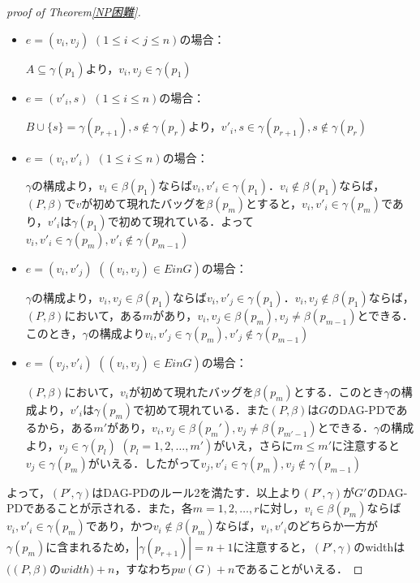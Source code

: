 \documentclass[master]{kuisthesis}		%
\theoremstyle{plain}
\theoremstyle{definition}
\begin{document}
\begin{proof}[proof of Theorem\ref{NP困難}]
    \begin{itemize}
        \item $e = (v_i, v_j)$ $(1 \leq i < j \leq n)$の場合：
        
        $A \subseteq \gamma(p_1)$より，$v_i, v_j \in \gamma(p_1)$
        \item $e = (v'_i, s)$ $(1 \leq i \leq n)$の場合：
        
        $B \cup \{s\} = \gamma(p_{r+1}), s \notin \gamma(p_r)$より，$v'_i, s \in \gamma(p_{r+1}), s \notin \gamma(p_r)$
        \item $e = (v_i, v'_i)$ $(1 \leq i \leq n)$の場合：
        
        $\gamma$の構成より，$v_i \in \beta(p_1)$ならば$v_i, v'_i \in \gamma(p_1)$．$v_i \notin \beta(p_1)$ならば，$(P, \beta)$で$v$が初めて現れたバッグを$\beta(p_m)$とすると，$v_i, v'_i \in \gamma(p_m)$であり，$v'_i$は$\gamma(p_1)$で初めて現れている．よって$v_i, v'_i \in \gamma(p_m), v'_i \notin \gamma(p_{m-1})$
        \item $e = (v_i, v'_j)$ $((v_i, v_j) \in E in G)$の場合：
        
        $\gamma$の構成より，$v_i, v_j \in \beta(p_1)$ならば$v_i, v'_j \in \gamma(p_1)$．$v_i, v_j \notin \beta(p_1)$ならば，$(P, \beta)$において，ある$m$があり，$v_i, v_j \in \beta(p_m), v_j \neq \beta(p_{m-1})$とできる．このとき，$\gamma$の構成より$v_i, v'_j \in \gamma(p_m), v'_j \notin \gamma(p_{m-1})$
        \item $e = (v_j, v'_i)$ $((v_i, v_j) \in E in G)$の場合：
        
        $(P, \beta)$において，$v_i$が初めて現れたバッグを$\beta(p_m)$とする．このとき$\gamma$の構成より，$v'_i$は$\gamma(p_m)$で初めて現れている．また$(P, \beta)$は$G$のDAG-PDであるから，ある$m'$があり，$v_i, v_j \in \beta(p_m'), v_j \neq \beta(p_{m'-1})$とできる．$\gamma$の構成より，$v_j \in \gamma(p_l)$ $(p_l = 1, 2, \dots, m')$がいえ，さらに$m \leq m'$に注意すると$v_j \in \gamma(p_m)$がいえる．したがって$v_j, v'_i \in \gamma(p_m), v_j \notin \gamma(p_{m-1})$
    \end{itemize}

    よって，$(P', \gamma)$はDAG-PDのルール2を満たす．以上より$(P', \gamma)$が$G'$のDAG-PDであることが示される．また，各$m = 1, 2, \dots, r$に対し，$v_i \in \beta(p_m)$ならば$v_i, v'_i \in \gamma(p_m)$であり，かつ$v_i \notin \beta(p_m)$ならば，$v_i, v'_i$のどちらか一方が$\gamma(p_m)$に含まれるため，$|\gamma(p_{r+1})| = n + 1$に注意すると，$(P', \gamma)$のwidthは$((P, \beta)$の$width)+ n$，すなわち$pw(G) + n$であることがいえる．


\end{proof}
\end{document}
